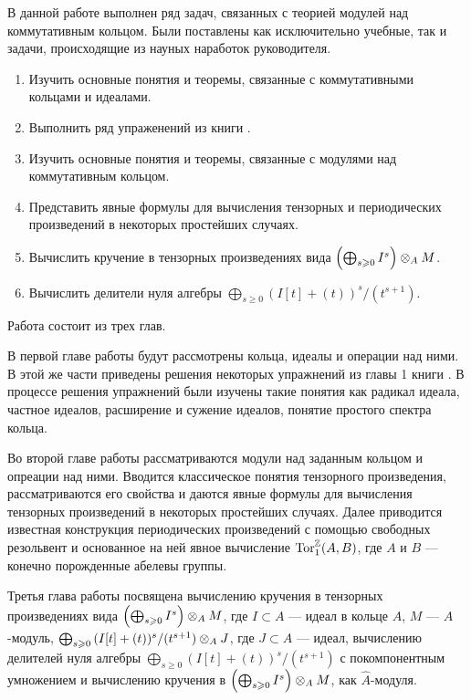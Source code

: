 В данной работе выполнен ряд задач, связанных с теорией модулей над коммутативным кольцом.
Были поставлены как исключительно учебные, так и задачи, происходящие из науных наработок руководителя.
\begin{enumerate}
    \item Изучить основные понятия и теоремы, связанные с коммутативными кольцами и идеалами.
    \item Выполнить ряд упраженений из книги \cite{A-M}.
    \item Изучить основные понятия и теоремы, связанные с модулями над коммутативным кольцом.
    \item Представить явные формулы для вычисления тензорных и периодических произведений в некоторых 
          простейших случаях.
    \item Вычислить кручение в тензорных произведениях вида $\left(\bigoplus_{s \geqslant 0} I^s \right) \otimes_A M$.
    \item Вычислить делители нуля алгебры $\bigoplus_{s \geq 0}{(I[t] + (t))^s / (t^{s + 1})}$.
\end{enumerate}
Работа состоит из трех глав.

В первой главе работы будут рассмотрены кольца, идеалы и операции над ними. В этой же части приведены решения некоторых упражнений из главы 1 книги \cite{A-M}. В процессе 
решения упражнений были изучены такие понятия как радикал идеала, частное идеалов, расширение и сужение идеалов, понятие простого спектра кольца.

Во второй главе работы рассматриваются модули над заданным кольцом и опреации над ними. 
Вводится классическое понятия тензорного произведения, рассматриваются его свойства и даются 
явные формулы для вычисления тензорных произведений в некоторых простейших случаях. 
Далее приводится известная конструкция периодических произведений с помощью свободных резольвент и 
основанное на ней явное вычисление $\textup{Tor}_1^{\mathbb{Z}}(A, B)$, где $A$ и $B$ --- конечно порожденные абелевы группы.

Третья глава работы посвящена вычислению кручения в тензорных произведениях вида
$\left(\bigoplus_{s \geqslant 0} I^s \right) \otimes_A M$, где $I \subset A$ --- идеал в кольце $A$, $M$ ---
$A$-модуль, $\bigoplus_{s \geqslant 0}{(I[t] + (t))^s / (t^{s + 1})} \otimes_A J$, где $J \subset A$ --- идеал,
вычислению делителей нуля алгебры $\bigoplus_{s \geq 0}{(I[t] + (t))^s / (t^{s + 1})}$ с покомпонентным
умножением и вычислению кручения в $\left(\bigoplus_{s \geqslant 0} I^s \right) \otimes_A M$, как $\hat A$-модуля.
